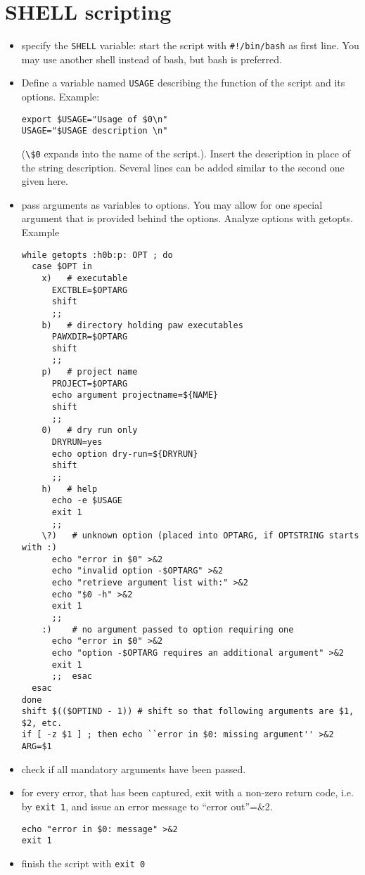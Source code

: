 \documentclass[11pt,a4paper]{report}
\begin{document}
\section{SHELL scripting}
\cite{1}
\begin{itemize}
\item specify the \verb|SHELL| variable: start the script with
  \verb|#!/bin/bash| as first line. You may use another shell instead
  of bash, but bash is preferred.
%
\item Define a variable named \verb|USAGE| describing the function of
  the script and its options. Example:
\begin{verbatim}
export $USAGE="Usage of $0\n"
USAGE="$USAGE description \n"
\end{verbatim}
(\verb|\$0| expands into the name of the script.). Insert the
description in place of the string description. Several lines can be
added similar to the second one given here.

%
\item pass arguments as variables to options. You may allow for one
  special argument that is provided behind the options. Analyze
  options with getopts. Example
\begin{verbatim}
while getopts :h0b:p: OPT ; do
  case $OPT in
    x)   # executable
      EXCTBLE=$OPTARG
      shift
      ;; 
    b)   # directory holding paw executables
      PAWXDIR=$OPTARG  
      shift
      ;; 
    p)   # project name
      PROJECT=$OPTARG
      echo argument projectname=${NAME}
      shift
      ;;
    0)   # dry run only
      DRYRUN=yes
      echo option dry-run=${DRYRUN}
      shift
      ;;
    h)   # help
      echo -e $USAGE
      exit 1
      ;;
    \?)   # unknown option (placed into OPTARG, if OPTSTRING starts with :)
      echo "error in $0" >&2
      echo "invalid option -$OPTARG" >&2
      echo "retrieve argument list with:" >&2
      echo "$0 -h" >&2
      exit 1
      ;;
    :)    # no argument passed to option requiring one
      echo "error in $0" >&2
      echo "option -$OPTARG requires an additional argument" >&2
      exit 1
      ;;  esac
  esac
done
shift $(($OPTIND - 1)) # shift so that following arguments are $1, $2, etc.
if [ -z $1 ] ; then echo ``error in $0: missing argument'' >&2
ARG=$1
\end{verbatim}
% 
\item check if all mandatory arguments have been passed.
%
\item for every error, that has been captured, exit with a non-zero
  return code, i.e. by \verb|exit 1|, and issue an error message to
  ``error out''=\&2.
\begin{verbatim}
echo "error in $0: message" >&2
exit 1
\end{verbatim}
%
\item finish the script with \verb|exit 0|
\end{itemize}
\end{document}
